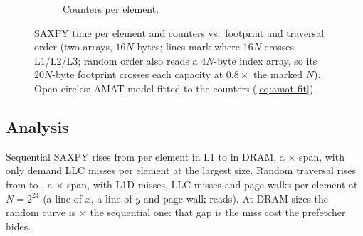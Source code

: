 \begin{figure}[tbp]
\begin{subfigure}[t]{0.49\linewidth}
{}
    \caption{Counters per element.}
  \end{subfigure}
  \caption{SAXPY time per element and counters vs.\ footprint and traversal order (two 
  arrays, $16N$ bytes; lines mark where $16N$ crosses L1/L2/L3; random order also reads a $4N$-byte index
  array, so its $20N$-byte footprint crosses each capacity at $0.8\times$ the marked $N$). Open circles: AMAT model fitted to the
  counters (\cref{eq:amat-fit}).}\label{fig:cache-miss}
\end{figure}

\subsection{Analysis}
Sequential SAXPY rises from  per element in L1 to
 in DRAM, a $\times$ span, with only
 demand LLC misses per element at the largest size. Random traversal rises from  to
, a $\times$ span, with 
L1D misses,  LLC misses and  page walks per element at
$N=2^{24}$ (a line of $x$, a line of $y$ and page-walk reads). At DRAM sizes the random curve is
$\times$ the sequential one: that gap is the miss cost the prefetcher hides.

